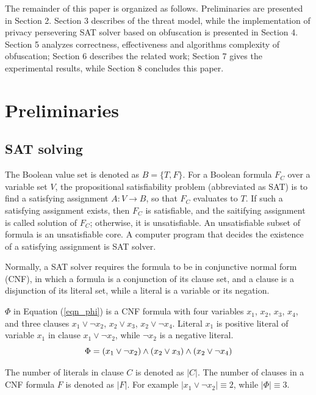 \documentclass[conference]{IEEEtran}
\begin{document}
The remainder of this paper is organized as follows.
Preliminaries are presented in Section 2.
Section 3 describes of the threat model,
while the implementation of privacy persevering SAT solver based on obfuscation is presented in Section 4.
Section 5 analyzes correctness, effectiveness and algorithms complexity of obfuscation;
Section 6 describes the related work;
Section 7 gives the experimental results,
while Section 8 concludes this paper.
%
%

\section{Preliminaries}

\subsection{SAT solving}
The Boolean value set is denoted as $B=\{T,F\}$.
For a Boolean formula $F_C$ over a variable set $V$,
the propositional satisfiability problem (abbreviated as SAT) is
to find a satisfying assignment $A : V\to B$,
so that $F_C$ evaluates to $T$.
If such a satisfying assignment exists,
then $F_C$ is satisfiable, and the saitifying assignment is called solution of $F_C$;
otherwise,
it is unsatisfiable.
An unsatisfiable subset of formula is an unsatisfiable core.
A computer program that decides the existence of a
satisfying assignment is SAT solver\cite{Minisat}.

Normally,
a SAT solver requires the formula to be in conjunctive normal form (CNF),
in which a formula is a conjunction of its clause set,
and a clause is a disjunction of its literal set,
while a literal is a variable or its negation.

$\Phi$ in Equation (\ref{eqn_phi}) is a CNF formula
with four variables $x_1$, $x_2$, $x_3$, $x_4$,
and three clauses $x_1\vee \neg x_2$, $x_2\vee x_3$, $x_2\vee \neg x_4$.
Literal $x_1$ is positive literal of variable $x_1$ in clause $x_1\vee \neg x_2$,
while $ \neg x_2$ is a negative literal.
\begin{equation}\label{eqn_phi}
\centering \Phi=(x_1\vee \neg x_2)
\wedge(x_2\vee x_3)
\wedge(x_2\vee \neg x_4)
\end{equation}

The number of literals in clause $C$ is denoted as $|C|$.
The number of clauses in a CNF formula $F$ is denoted as $|F|$.
For example $| x_1\vee  \neg x_2 |\equiv 2$,
while $|\Phi|\equiv 3$.
\end{document}
